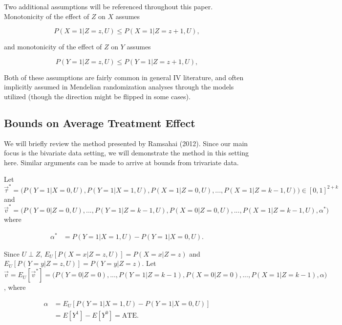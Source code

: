 \documentclass[
]{article}
\theoremstyle{plain}
\begin{document}
Two additional assumptions will be referenced throughout this paper. Monotonicity of the effect of \(Z\) on \(X\) assumes

\begin{equation}
P(X = 1 | Z = z, U) \le P(X = 1 | Z = z+1, U), \label{eq:x_monotone}
\end{equation}

and monotonicity of the effect of \(Z\) on \(Y\) assumes

\begin{equation}
P(Y = 1 | Z = z, U) \le P(Y = 1 | Z = z+1, U), \label{eq:y_monotone}
\end{equation}

Both of these assumptions are fairly common in general IV literature, and often implicitly assumed in Mendelian randomization analyses through the models utilized (though the direction might be flipped in some cases).

\hypertarget{bounds-on-average-treatment-effect}{%
\subsection{Bounds on Average Treatment Effect}\label{bounds-on-average-treatment-effect}}

We will briefly review the method presented by Ramsahai (2012). Since our main focus is the bivariate data setting, we will demonstrate the method in this setting here. Similar arguments can be made to arrive at bounds from trivariate data.

Let \(\vec{\tau}^* = \Big(P(Y = 1 | X = 0, U), P(Y = 1 | X = 1, U), P(X = 1 | Z = 0, U), ..., P(X = 1 | Z = k-1, U)\Big) \in [0,1]^{2+k}\) and \(\vec{v}^* = \Big(P(Y = 0 | Z = 0, U), ..., P(Y = 1 | Z = k-1, U), P(X = 0 | Z = 0, U), ..., P(X = 1 | Z = k-1, U), \alpha^*\Big)\) where

\[
\begin{aligned}
\alpha^* &= P(Y = 1 | X = 1, U) - P(Y = 1 | X = 0, U).
\end{aligned}
\]

Since \(U \perp Z\), \(E_U[P(X = x | Z = z, U)] = P(X = x | Z = z)\) and \(E_U[P(Y = y | Z = z, U)] = P(Y = y | Z = z)\). Let \(\vec{v} = E_U[\vec{v}^*] = \Big(P(Y = 0 | Z = 0), ..., P(Y = 1 | Z = k-1), P(X = 0 | Z = 0), ..., P(X = 1 | Z = k-1), \alpha \Big)\), where

\[
\begin{aligned}
\alpha &= E_U[P(Y = 1 | X = 1, U) - P(Y = 1 | X = 0, U)] \\
       &= E[Y^1] - E[Y^0] = \text{ATE}.
\end{aligned}
\]
\end{document}
